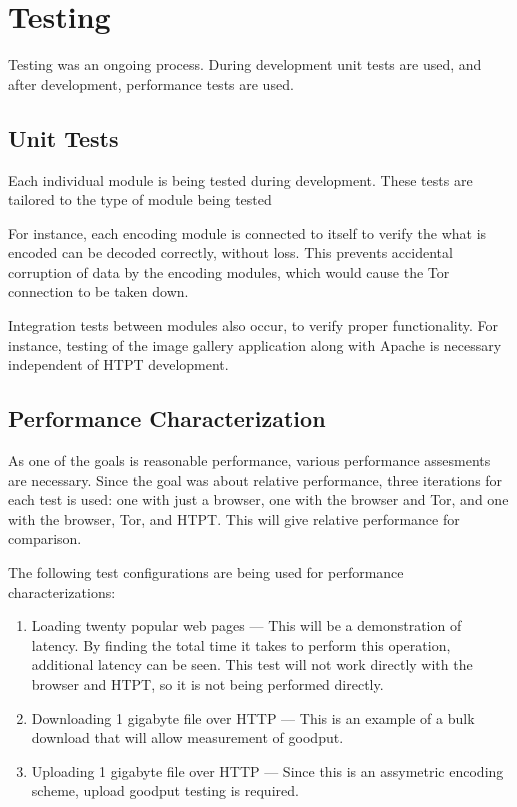 \section{Testing}

Testing was an ongoing process. During development unit tests are used, and after development, performance tests are used. 

\subsection{Unit Tests}
Each individual module is being tested during development. These tests are tailored to the type of module being tested

For instance, each encoding module is connected to itself to verify the what is encoded can be decoded correctly, without loss. This prevents accidental corruption of data by the encoding modules, which would cause the Tor connection to be taken down.

Integration tests between modules also occur, to verify proper functionality. For instance, testing of the image gallery application along with Apache is necessary independent of HTPT development. 

\subsection{Performance Characterization}
As one of the goals is reasonable performance, various performance assesments are necessary. Since the goal was about relative performance, three iterations for each test is used: one with just a browser, one with the browser and Tor, and one with the browser, Tor, and HTPT. This will give relative performance for comparison. 

The following test configurations are being used for performance characterizations:  
\begin{enumerate}
  \item Loading twenty popular web pages --- This will be a demonstration of latency. By finding the total time it takes to perform this operation, additional latency can be seen. This test will not work directly with the browser and HTPT, so it is not being performed directly. 
  \item Downloading 1 gigabyte file over HTTP --- This is an example of a bulk download that will allow measurement of goodput.
  \item Uploading 1 gigabyte file over HTTP --- Since this is an assymetric encoding scheme, upload goodput testing is required.
\end{enumerate}

